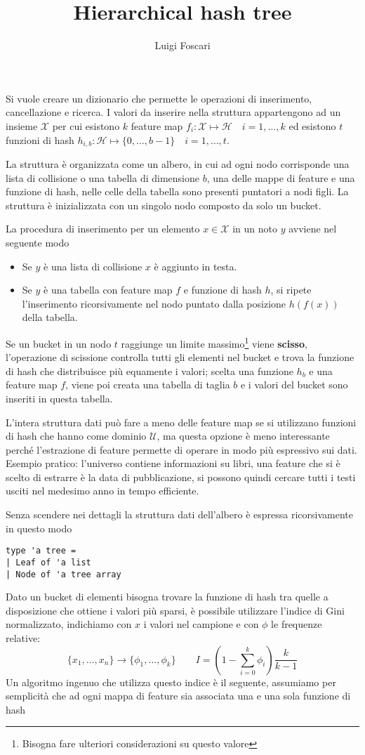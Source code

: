 \documentclass[a4paper]{article}
\title{Hierarchical hash tree}
\author{Luigi Foscari}
\date{}
\begin{document}
\maketitle

Si vuole creare un dizionario che permette le operazioni di inserimento, cancellazione e ricerca. I valori da inserire nella struttura appartengono ad un insieme $\mathcal{X}$ per cui esistono $k$ feature map $f_i: \mathcal{X} \mapsto \mathcal{H} \quad i=1,\ldots,k$ ed esistono $t$ funzioni di hash $h_{i,b}: \mathcal{H} \mapsto \{ 0,\ldots,b-1 \} \quad i=1,\ldots,t$.

La struttura è organizzata come un albero, in cui ad ogni nodo corrisponde una lista di collisione o una tabella di dimensione $b$, una delle mappe di feature e una funzione di hash, nelle celle della tabella sono presenti puntatori a nodi figli. La struttura è inizializzata con un singolo nodo composto da solo un bucket.

La procedura di inserimento per un elemento $x \in \mathcal{X}$ in un noto $y$ avviene nel seguente modo
\begin{itemize}
	\item Se $y$ è una lista di collisione $x$ è aggiunto in testa.
	\item Se $y$ è una tabella con feature map $f$ e funzione di hash $h$, si ripete l'inserimento ricorsivamente nel nodo puntato dalla posizione $h(f(x))$ della tabella.
\end{itemize}

Se un bucket in un nodo $t$ raggiunge un limite massimo\footnote{Bisogna fare ulteriori considerazioni su questo valore} viene \textbf{scisso}, l'operazione di scissione controlla tutti gli elementi nel bucket e trova la funzione di hash che distribuisce più equamente i valori; scelta una funzione $h_{b}$ e una feature map $f$, viene poi creata una tabella di taglia $b$ e i valori del bucket sono inseriti in questa tabella.

L'intera struttura dati può fare a meno delle feature map se si utilizzano funzioni di hash che hanno come dominio $\mathcal{U}$, ma questa opzione è meno interessante perché l'estrazione di feature permette di operare in modo più espressivo sui dati. Esempio pratico: l'universo contiene informazioni su libri, una feature che si è scelto di estrarre è la data di pubblicazione, si possono quindi cercare tutti i testi usciti nel medesimo anno in tempo efficiente.

Senza scendere nei dettagli la struttura dati dell'albero è espressa ricorsivamente in questo modo
\begin{verbatim}
type 'a tree =
| Leaf of 'a list
| Node of 'a tree array
\end{verbatim}
Dato un bucket di elementi bisogna trovare la funzione di hash tra quelle a disposizione che ottiene i valori più sparsi, è possibile utilizzare l'indice di Gini normalizzato, indichiamo con $x$ i valori nel campione e con $\phi$ le frequenze relative:
$$ \{ x_1, \ldots, x_n \} \rightarrow \{ \phi_1, \ldots, \phi_k \} \qquad I = \left( 1 - \sum_{i=0}^{k}\phi_i \right) \frac{k}{k - 1} $$
Un algoritmo ingenuo che utilizza questo indice è il seguente, assumiamo per semplicità che ad ogni mappa di feature sia associata una e una sola funzione di hash
\end{document}
